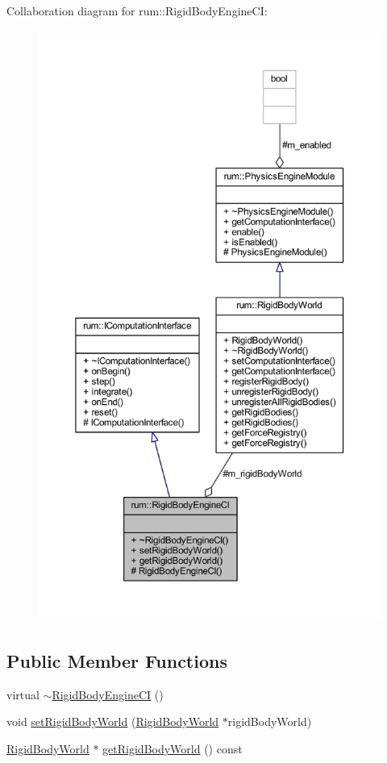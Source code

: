 Collaboration diagram for rum\+:\+:Rigid\+Body\+Engine\+CI\+:\nopagebreak
\begin{figure}[H]
\begin{center}
\leavevmode
\includegraphics[height=550pt]{classrum_1_1_rigid_body_engine_c_i__coll__graph}
\end{center}
\end{figure}
\subsection*{Public Member Functions}
\begin{DoxyCompactItemize}
\item 
virtual \mbox{\hyperlink{classrum_1_1_rigid_body_engine_c_i_ad7289e69d0c6261c51736b37abb79797}{$\sim$\+Rigid\+Body\+Engine\+CI}} ()
\item 
void \mbox{\hyperlink{classrum_1_1_rigid_body_engine_c_i_aa7eac95fabcaba6c5b9c74d0ddfe7cf2}{set\+Rigid\+Body\+World}} (\mbox{\hyperlink{classrum_1_1_rigid_body_world}{Rigid\+Body\+World}} $\ast$rigid\+Body\+World)
\item 
\mbox{\hyperlink{classrum_1_1_rigid_body_world}{Rigid\+Body\+World}} $\ast$ \mbox{\hyperlink{classrum_1_1_rigid_body_engine_c_i_aaeffeec80ab7e8f10c3d64feb6e880f0}{get\+Rigid\+Body\+World}} () const
\end{DoxyCompactItemize}
